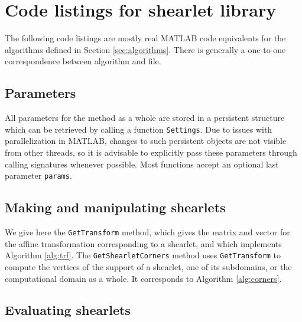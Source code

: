 \chapter{Code listings for shearlet library}

The following code listings are mostly real MATLAB code equivalents for the algorithms defined in Section
\ref{sec:algorithms}. There is generally a one-to-one correspondence between algorithm and file.

\section{Parameters}

All parameters for the method as a whole are stored in a persistent structure which can be retrieved by
calling a function {\tt Settings}. Due to issues with parallelization in MATLAB, changes to such persistent
objects are not visible from other threads, so it is advisable to explicitly pass these parameters through
calling signatures whenever possible. Most functions accept an optional last parameter {\tt params}.

%

\section{Making and manipulating shearlets}

We give here the {\tt GetTransform} method, which gives the matrix and vector for the affine transformation
corresponding to a shearlet, and which implements Algorithm \ref{alg:trf}. The {\tt GetShearletCorners} method
uses {\tt GetTransform} to compute the vertices of the support of a shearlet, one of its subdomains, or the
computational domain as a whole. It corresponds to Algorithm \ref{alg:corners}.

%
%
%
%
%



\section{Evaluating shearlets} \label{sec:lst-eval-shlets}

